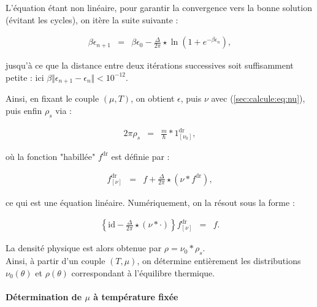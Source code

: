 L'équation étant non linéaire, pour garantir la convergence vers la bonne solution (évitant les cycles), on itère la suite suivante :

\begin{eqnarray*}
	\beta \epsilon_{n+1} & = & \beta \epsilon_0 -   \frac{\Delta}{2\pi} \star \ln \left( 1 + e^{-\beta \epsilon_n} \right) ,
\end{eqnarray*}

jusqu'à ce que la distance entre deux itérations successives soit suffisamment petite : ici $\beta \Vert \epsilon_{n+1} - \epsilon_n \Vert < 10^{-12}$.

Ainsi, en fixant le couple $(\mu, T)$, on obtient $\epsilon$, puis $\nu$ avec (\ref{sec:calcule:eq:nu}), puis enfin $\rho_s$ via :

\begin{eqnarray*}
	2\pi \rho_s & = & \frac{m}{\hbar} \ast 1^{\mathrm{dr}}_{[\nu_0]},
\end{eqnarray*}

où la fonction "habillée" $f^{\mathrm{dr}}$ est définie par :

\begin{eqnarray*}
	f^{\mathrm{dr}}_{[\nu]} & = & f + \frac{\Delta}{2\pi} \star ( \nu \ast f^{\mathrm{dr}} ),
\end{eqnarray*}

ce qui est une équation linéaire. Numériquement, on la résout sous la forme :

\begin{eqnarray*}
	\left\{ \mathrm{id} - \frac{\Delta}{2\pi} \star ( \nu \ast \cdot ) \right\} f^{\mathrm{dr}}_{[\nu]} & = & f.
\end{eqnarray*}

La densité physique est alors obtenue par $\rho = \nu_0 \ast \rho_s$.\\


Ainsi, à partir d’un couple $(T, \mu)$, on détermine entièrement les distributions $\nu_0(\theta)$ et $\rho(\theta)$ correspondant à l’équilibre thermique.

\paragraph{Détermination de $\mu$ à température fixée}

